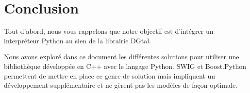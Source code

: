 \documentclass[11pt, french, screen]{report-rd-info}
\begin{document}










\chapter{Conclusion}

Tout d'abord, nous vous rappelons que notre objectif est d'intégrer un interpréteur Python au sien de la librairie DGtal.

Nous avons exploré dans ce document les différentes solutions pour utiliser une bibliothèque développée en C++ avec le langage Python. 
SWIG et Boost.Python permettent de mettre en place ce genre de solution mais impliquent un développement supplémentaire et ne gèrent pas les modèles de façon optimale.
\end{document}

